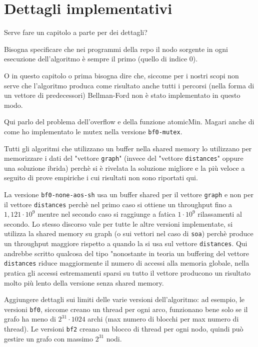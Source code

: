 \documentclass[a4paper]{article}
\begin{document}
	\section{Dettagli implementativi}
	\label{section:impl}
	Serve fare un capitolo a parte per dei dettagli?
	
	Bisogna specificare che nei programmi della repo il nodo sorgente in ogni esecuzione dell'algoritmo è sempre il primo (quello di indice 0).
	
	O in questo capitolo o prima bisogna dire che, siccome per i nostri scopi non serve che l'algoritmo produca come risultato anche tutti i percorsi (nella forma di un vettore di predecessori) Bellman-Ford non è stato implementato in questo modo.
	
	Qui parlo del problema dell'overflow e della funzione atomicMin. Magari anche di come ho implementato le mutex nella versione \texttt{bf0-mutex}.
	
	Tutti gli algoritmi che utilizzano un buffer nella shared memory lo utilizzano per memorizzare i dati del "vettore \texttt{graph}" (invece del "vettore \texttt{distances}" oppure una soluzione ibrida) perchè si è rivelata la soluzione migliore e la più veloce a seguito di prove empiriche i cui risultati non sono riportati qui.
	
	La versione \texttt{bf0-none-aos-sh} usa un buffer shared per il vettore \texttt{graph} e non per il vettore \texttt{distances} perchè nel primo caso si ottiene un throughput fino a $1,121\cdot 10^9$ mentre nel secondo caso si raggiunge a fatica $1\cdot 10^9$ rilassamenti al secondo. Lo stesso discorso vale per tutte le altre versioni implementate, si utilizza la shared memory su graph (o sui vettori nel caso di \texttt{soa}) perchè produce un throughput maggiore rispetto a quando la si usa sul vettore \texttt{distances}. Qui andrebbe scritto qualcosa del tipo "nonostante in teoria un buffering del vettore \texttt{distances} riduce maggiormente il numero di accessi alla memoria globale, nella pratica gli accessi estremamenti sparsi su tutto il vettore producono un risultato molto più lento della versione senza shared memory.
	
	Aggiungere dettagli sui limiti delle varie versioni dell'algoritmo: ad esempio, le versioni \texttt{bf0}, siccome creano un thread per ogni arco, funzionano bene solo se il grafo ha meno di $2^{31}\cdot 1024$ archi (max numero di blocchi per max numero di thread). Le versioni \texttt{bf2} creano un blocco di thread per ogni nodo, quindi può gestire un grafo con massimo $2^{31}$ nodi.
	
\end{document}
